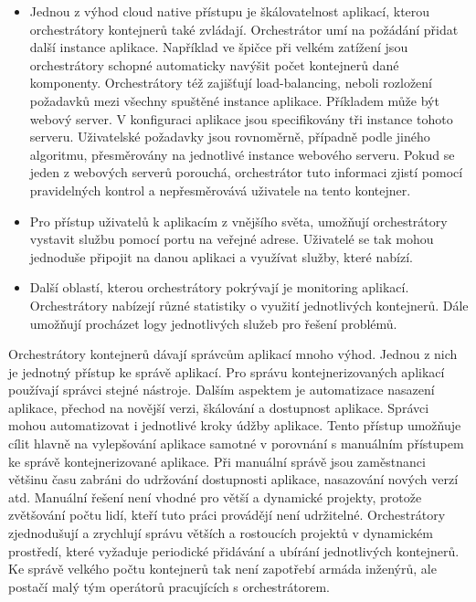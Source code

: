 \begin{itemize}
\item Jednou z výhod cloud native přístupu je škálovatelnost aplikací, kterou orchestrátory kontejnerů také zvládají. Orchestrátor umí na požádání přidat další instance aplikace. Například ve špičce při velkém zatížení jsou orchestrátory schopné automaticky navýšit počet kontejnerů dané komponenty. Orchestrátory též zajišťují load-balancing, neboli rozložení požadavků mezi všechny spuštěné instance aplikace. Příkladem může být webový server. V konfiguraci aplikace jsou specifikovány tři instance tohoto serveru. Uživatelské požadavky jsou rovnoměrně, případně podle jiného algoritmu, přesměrovány na jednotlivé instance webového serveru. Pokud se jeden z webových serverů porouchá, orchestrátor tuto informaci zjistí pomocí pravidelných kontrol a nepřesměrovává uživatele na tento kontejner. 

\item Pro přístup uživatelů k aplikacím z vnějšího světa, umožňují orchestrátory vystavit službu pomocí portu na veřejné adrese. Uživatelé se tak mohou jednoduše připojit na danou aplikaci a využívat služby, které nabízí. 
\item Další oblastí, kterou orchestrátory pokrývají je monitoring aplikací. Orchestrátory nabízejí různé statistiky o využití jednotlivých kontejnerů. Dále umožňují procházet logy jednotlivých služeb pro řešení problémů. 
\end{itemize}
\par
Orchestrátory kontejnerů dávají správcům aplikací mnoho výhod. Jednou z nich je jednotný přístup ke správě aplikací. Pro správu kontejnerizovaných aplikací používají správci stejné nástroje. Dalším aspektem je automatizace nasazení aplikace, přechod na novější verzi, škálování a dostupnost aplikace. Správci mohou automatizovat i jednotlivé kroky údžby aplikace. Tento přístup umožňuje cílit hlavně na vylepšování aplikace samotné v porovnání s manuálním přístupem ke správě kontejnerizované aplikace. Při manuální správě jsou zaměstnanci většinu času zabráni do udržování dostupnosti aplikace, nasazování nových verzí atd. Manuální řešení není vhodné pro větší a dynamické projekty, protože zvětšování počtu lidí, kteří tuto práci provádějí není udržitelné. Orchestrátory zjednodušují a zrychlují správu větších a rostoucích projektů v dynamickém prostředí, které vyžaduje periodické přidávání a ubírání jednotlivých kontejnerů. Ke správě velkého počtu kontejnerů tak není zapotřebí armáda inženýrů, ale postačí malý tým operátorů pracujících s orchestrátorem. \par

